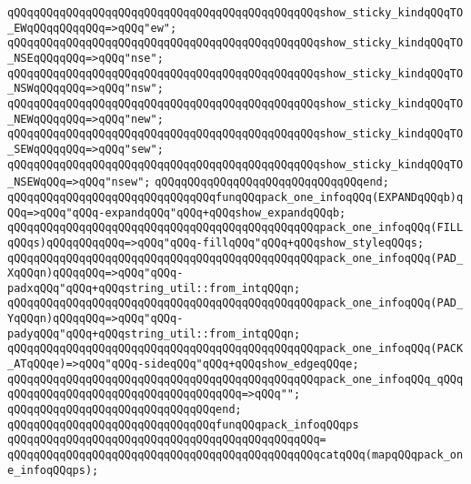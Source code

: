 \verb|qQQqqQQqqQQqqQQqqQQqqQQqqQQqqQQqqQQqqQQqqQQqqQQqshow_sticky_kindqQQqTO_EWqQQqqQQqqQQq=>qQQq"ew";|\newline
\verb|qQQqqQQqqQQqqQQqqQQqqQQqqQQqqQQqqQQqqQQqqQQqqQQqshow_sticky_kindqQQqTO_NSEqQQqqQQq=>qQQq"nse";|\newline
\verb|qQQqqQQqqQQqqQQqqQQqqQQqqQQqqQQqqQQqqQQqqQQqqQQqshow_sticky_kindqQQqTO_NSWqQQqqQQq=>qQQq"nsw";|\newline
\verb|qQQqqQQqqQQqqQQqqQQqqQQqqQQqqQQqqQQqqQQqqQQqqQQqshow_sticky_kindqQQqTO_NEWqQQqqQQq=>qQQq"new";|\newline
\verb|qQQqqQQqqQQqqQQqqQQqqQQqqQQqqQQqqQQqqQQqqQQqqQQqshow_sticky_kindqQQqTO_SEWqQQqqQQq=>qQQq"sew";|\newline
\verb|qQQqqQQqqQQqqQQqqQQqqQQqqQQqqQQqqQQqqQQqqQQqqQQqshow_sticky_kindqQQqTO_NSEWqQQq=>qQQq"nsew";|\newline
\verb|qQQqqQQqqQQqqQQqqQQqqQQqqQQqqQQqend;|\newline
\newline
\verb|qQQqqQQqqQQqqQQqqQQqqQQqqQQqqQQqfunqQQqpack_one_infoqQQq(EXPANDqQQqb)qQQq=>qQQq"qQQq-expandqQQq"qQQq+qQQqshow_expandqQQqb;|\newline
\verb|qQQqqQQqqQQqqQQqqQQqqQQqqQQqqQQqqQQqqQQqqQQqqQQqpack_one_infoqQQq(FILLqQQqs)qQQqqQQqqQQq=>qQQq"qQQq-fillqQQq"qQQq+qQQqshow_styleqQQqs;|\newline
\verb|qQQqqQQqqQQqqQQqqQQqqQQqqQQqqQQqqQQqqQQqqQQqqQQqpack_one_infoqQQq(PAD_XqQQqn)qQQqqQQq=>qQQq"qQQq-padxqQQq"qQQq+qQQqstring_util::from_intqQQqn;|\newline
\verb|qQQqqQQqqQQqqQQqqQQqqQQqqQQqqQQqqQQqqQQqqQQqqQQqpack_one_infoqQQq(PAD_YqQQqn)qQQqqQQq=>qQQq"qQQq-padyqQQq"qQQq+qQQqstring_util::from_intqQQqn;|\newline
\verb|qQQqqQQqqQQqqQQqqQQqqQQqqQQqqQQqqQQqqQQqqQQqqQQqpack_one_infoqQQq(PACK_ATqQQqe)=>qQQq"qQQq-sideqQQq"qQQq+qQQqshow_edgeqQQqe;|\newline
\verb|qQQqqQQqqQQqqQQqqQQqqQQqqQQqqQQqqQQqqQQqqQQqqQQqpack_one_infoqQQq_qQQqqQQqqQQqqQQqqQQqqQQqqQQqqQQqqQQqqQQq=>qQQq"";|\newline
\verb|qQQqqQQqqQQqqQQqqQQqqQQqqQQqqQQqend;|\newline
\newline
\verb|qQQqqQQqqQQqqQQqqQQqqQQqqQQqqQQqfunqQQqpack_infoqQQqps|\newline
\verb|qQQqqQQqqQQqqQQqqQQqqQQqqQQqqQQqqQQqqQQqqQQqqQQq=|\newline
\verb|qQQqqQQqqQQqqQQqqQQqqQQqqQQqqQQqqQQqqQQqqQQqqQQqcatqQQq(mapqQQqpack_one_infoqQQqps);|\newline
